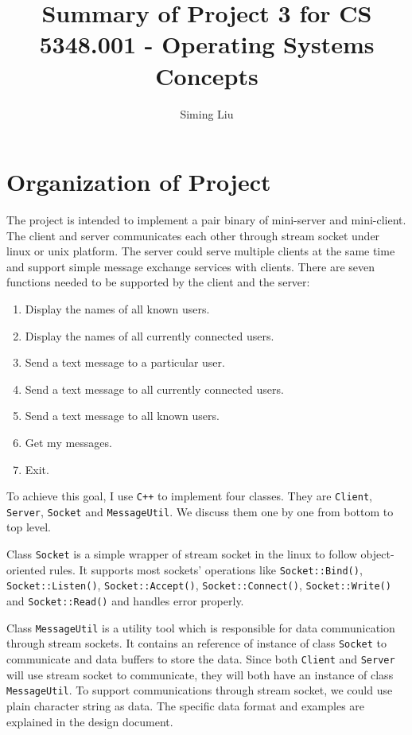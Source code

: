 \documentclass[a4paper]{report}
\begin{document}
\title{Summary of Project 3 for CS 5348.001 - Operating Systems Concepts}

\author{Siming Liu}

\maketitle{}

\section*{Organization of Project}
The project is intended to implement a pair binary of mini-server and mini-client. The client and server communicates each other through stream socket under linux or unix platform. The server could serve multiple clients at the same time and support simple message exchange services with clients. There are seven functions needed to be supported by the client and the server:
\begin{enumerate}[label=\textbf{\textit{\alph*}})]
  \item Display the names of all known users.
  \item Display the names of all currently connected users.
  \item Send a text message to a particular user.
  \item Send a text message to all currently connected users.
  \item Send a text message to all known users.
  \item Get my messages.
  \item Exit.
\end{enumerate}

\noindent To achieve this goal, I use \lstinline{C++} to implement four classes. They are \lstinline{Client}, \lstinline{Server}, \lstinline{Socket} and \lstinline{MessageUtil}. We discuss them one by one from bottom to top level.

\noindent Class \lstinline{Socket} is a simple wrapper of stream socket in the linux to follow object-oriented rules. It supports most sockets' operations like \lstinline{Socket::Bind()}, \lstinline{Socket::Listen()}, \lstinline{Socket::Accept()}, \lstinline{Socket::Connect()}, \lstinline{Socket::Write()} and \lstinline{Socket::Read()} and handles error properly.

\noindent Class \lstinline{MessageUtil} is a utility tool which is responsible for data communication through stream sockets. It contains an reference of instance of class \lstinline{Socket} to communicate and data buffers to store the data. Since both \lstinline{Client} and \lstinline{Server} will use stream socket to communicate, they will both have an instance of class \lstinline{MessageUtil}. To support communications through stream socket, we could use plain character string as data. The specific data format and examples are explained in the design document.
\end{document}
